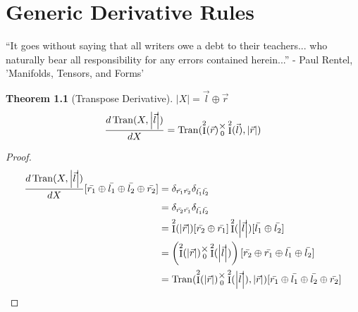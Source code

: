 \documentclass[12pt]{book}
\theoremstyle{plain}
\newtheorem{theorem}{Theorem}[chapter]
\theoremstyle{definition}
\theoremstyle{ppart}
\theoremstyle{case}
\theoremstyle{solution}
\DeclareMathOperator{\Ident}{I}
\DeclareMathOperator{\Tran}{Tran}
\newcommand{\mmult}[1]{\text{\raisebox{1ex}{$\underset{#1}{\times}$}}}
\newcommand{\shape}[1]{\left|#1\right|}
\begin{document}
\chapter{Generic Derivative Rules}

\begin{displayquote}
``It goes without saying that all writers owe a debt to their teachers... who
naturally bear all responsibility for any errors contained herein...''
- Paul Rentel, 'Manifolds, Tensors, and Forms'
\end{displayquote}

\begin{theorem}[Transpose Derivative]
\label{tran_derivative}
$\shape{X} = \vec{l} \oplus \vec{r}$
\[
 \frac{d\Tran(X, \shape{\vec{l}})}{dX} =
 \Tran(\Ident^2(\vec{r}) \mmult{0} \Ident^2(\vec{l}), \shape{\vec{r}})
\]
\end{theorem}
\begin{proof}
\begin{align*}
 \frac{d\Tran(X, \shape{\vec{l}})}{dX}
 [\bar{r_1} \oplus \bar{l_1} \oplus \bar{l_2} \oplus \bar{r_2}]
 &= \delta_{\bar{r_1}\bar{r_2}} \delta_{\bar{l_1}\bar{l_2}} \\
 &= \delta_{\bar{r_2}\bar{r_1}} \delta_{\bar{l_1}\bar{l_2}} \\
 &=
  \Ident^2(\shape{\vec{r}})[\bar{r_2}\oplus\bar{r_1}]
  \Ident^2(\shape{\vec{l}})[\bar{l_1}\oplus\bar{l_2}] \\
 &=
   \left(
    \Ident^2(\shape{\vec{r}})
    \mmult{0}
    \Ident^2(\shape{\vec{l}})
  \right)
  [\bar{r_2}\oplus\bar{r_1}\oplus\bar{l_1}\oplus\bar{l_2}] \\
 &=
  \Tran(
    \Ident^2(\shape{\vec{r}})
    \mmult{0}
    \Ident^2(\shape{\vec{l}})
  , \shape{\vec{r}}) 
 [\bar{r_1} \oplus \bar{l_1} \oplus \bar{l_2} \oplus \bar{r_2}]
\end{align*}
\end{proof}
\end{document}
